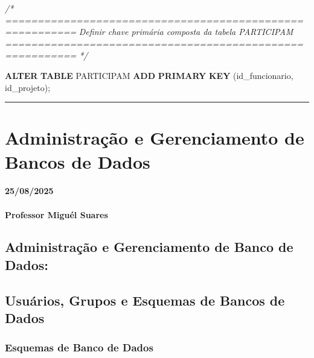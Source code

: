 \documentclass[
]{book}
\newenvironment{Shaded}{\begin{snugshade}}{\end{snugshade}}
\newcommand{\CommentTok}[1]{\textcolor[rgb]{0.56,0.35,0.01}{\textit{#1}}}
\newcommand{\KeywordTok}[1]{\textcolor[rgb]{0.13,0.29,0.53}{\textbf{#1}}}
\newcommand{\NormalTok}[1]{#1}
\begin{document}
\begin{Shaded}
\begin{Highlighting}[]
\CommentTok{/* =========================================================}
\CommentTok{   Definir chave primária composta da tabela PARTICIPAM}
\CommentTok{   ========================================================= */}

\KeywordTok{ALTER} \KeywordTok{TABLE}\NormalTok{ PARTICIPAM }\KeywordTok{ADD} \KeywordTok{PRIMARY} \KeywordTok{KEY}\NormalTok{ (id\_funcionario, id\_projeto);}

\end{Highlighting}
\end{Shaded}

\begin{center}\rule{0.5\linewidth}{0.5pt}\end{center}

\chapter{Administração e Gerenciamento de Bancos de Dados}\label{administrauxe7uxe3o-e-gerenciamento-de-bancos-de-dados}

\subsubsection*{25/08/2025}\label{section-3}

\subsubsection*{Professor Miguél Suares}\label{professor-miguuxe9l-suares-3}

\section{Administração e Gerenciamento de Banco de Dados:}\label{administrauxe7uxe3o-e-gerenciamento-de-banco-de-dados}

\section{Usuários, Grupos e Esquemas de Bancos de Dados}\label{usuuxe1rios-grupos-e-esquemas-de-bancos-de-dados}

\subsection{Esquemas de Banco de Dados}\label{esquemas-de-banco-de-dados}
\end{document}
